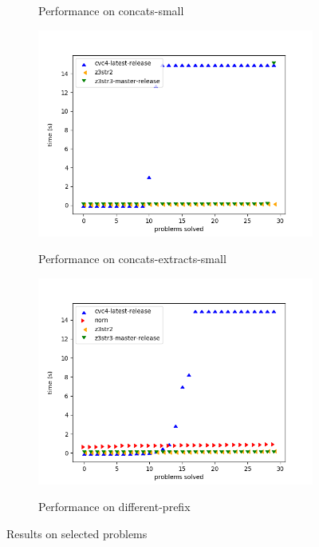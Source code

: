 \begin{figure}[H]
\begin{subfigure}{.5\textwidth}
            \label{fig:concats-small}
            \caption{Performance on concats-small}
        \end{subfigure}
        \begin{subfigure}{.5\textwidth}
            \includegraphics[width=\textwidth]{data/graphs/concats-extracts-small.png}
            \label{fig:concats-extracts-small}
            \caption{Performance on concats-extracts-small}
        \end{subfigure}
        \begin{subfigure}{.5\textwidth}
            \includegraphics[width=\textwidth]{data/graphs/different-prefix.png}
            \label{fig:different-prefix}
            \caption{Performance on different-prefix}
        \end{subfigure}
        \caption{Results on selected \fuzzer{} problems}
        \label{fig:graphs}
    \end{figure}

